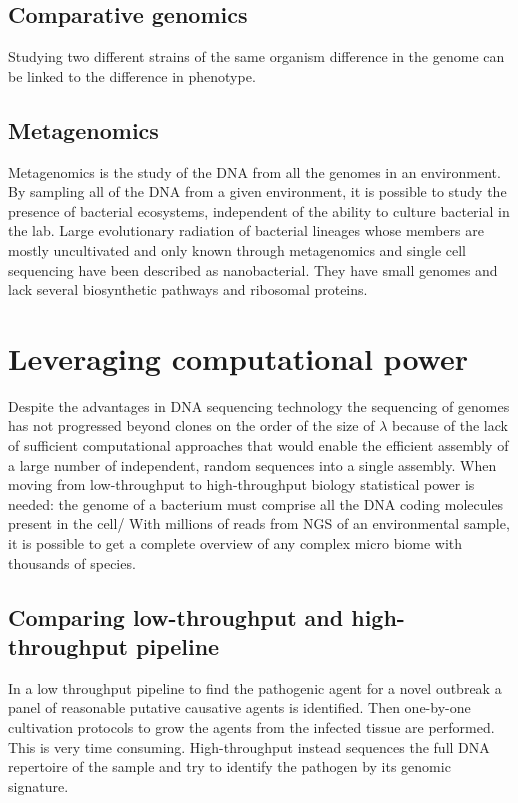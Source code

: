 	\subsection{Comparative genomics}
	Studying two different strains of the same organism difference in the genome can be linked to the difference in phenotype.

	\subsection{Metagenomics}
	Metagenomics is the study of the DNA from all the genomes in an environment.
	By sampling all of the DNA from a given environment, it is possible to study the presence of bacterial ecosystems, independent of the ability to culture bacterial in the lab.
	Large evolutionary radiation of bacterial lineages whose members are mostly uncultivated and only known through metagenomics and single cell sequencing have been described as nanobacterial.
	They have small genomes and lack several biosynthetic pathways and ribosomal proteins.

\section{Leveraging computational power}
Despite the advantages in DNA sequencing technology the sequencing of genomes has not progressed beyond clones on the order of the size of $\lambda$ because of the lack of sufficient computational approaches that would enable the efficient assembly of a large number of independent, random sequences into a single assembly.
When moving from low-throughput to high-throughput biology statistical power is needed: the genome of a bacterium must comprise all the DNA coding molecules present in the cell/
With millions of reads from NGS of an environmental sample, it is possible to get a complete overview of any complex micro biome with thousands of species.

	\subsection{Comparing low-throughput and high-throughput pipeline}
	In a low throughput pipeline to find the pathogenic agent for a novel outbreak a panel of reasonable putative causative agents is identified.
	Then one-by-one cultivation protocols to grow the agents from the infected tissue are performed.
	This is very time consuming.
	High-throughput instead sequences the full DNA repertoire of the sample and try to identify the pathogen by its genomic signature.
